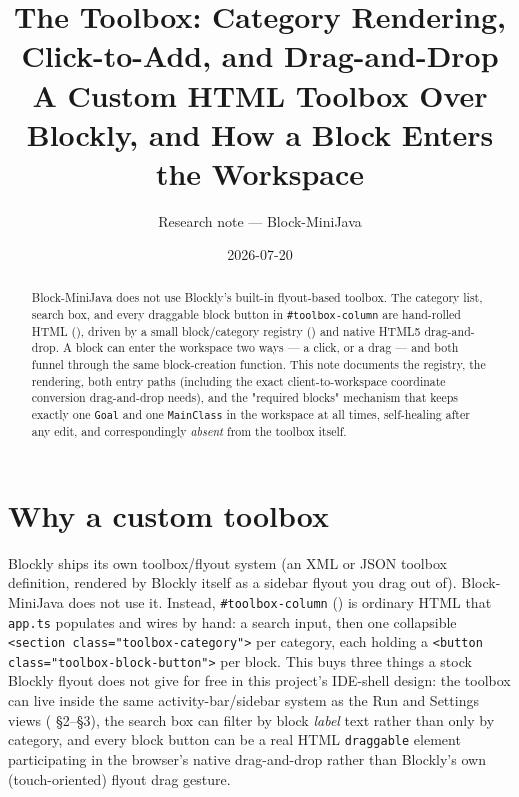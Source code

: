 \documentclass[11pt]{article}
\title{The Toolbox: Category Rendering, Click-to-Add, and Drag-and-Drop\\
\large A Custom HTML Toolbox Over Blockly, and How a Block Enters the Workspace}
\author{Research note --- Block-MiniJava}
\date{2026-07-20}
\begin{document}
\maketitle

\begin{abstract}
Block-MiniJava does not use Blockly's built-in flyout-based toolbox. The
category list, search box, and every draggable block button in
\texttt{\#toolbox-column} are hand-rolled HTML
(\texttt{}), driven by a small block/category registry
(\texttt{}) and native HTML5
drag-and-drop. A block can enter the workspace two ways --- a click, or a
drag --- and both funnel through the same block-creation function. This
note documents the registry, the rendering, both entry paths (including
the exact client-to-workspace coordinate conversion drag-and-drop needs),
and the "required blocks" mechanism that keeps exactly one \texttt{Goal}
and one \texttt{MainClass} in the workspace at all times, self-healing
after any edit, and correspondingly \emph{absent} from the toolbox itself.
\end{abstract}

\tableofcontents

\section{Why a custom toolbox}

Blockly ships its own toolbox/flyout system (an XML or JSON toolbox
definition, rendered by Blockly itself as a sidebar flyout you drag out
of). Block-MiniJava does not use it. Instead, \texttt{\#toolbox-column}
(\texttt{}) is ordinary HTML that \texttt{app.ts}
populates and wires by hand: a search input, then one collapsible
\texttt{<section class="toolbox-category">} per category, each holding a
\texttt{<button class="toolbox-block-button">} per block. This buys three
things a stock Blockly flyout does not give for free in this project's
IDE-shell design: the toolbox can live inside the same activity-bar/sidebar
system as the Run and Settings views (\texttt{}
\S2--\S3), the search box can filter by block \emph{label} text rather than
only by category, and every block button can be a real HTML
\texttt{draggable} element participating in the browser's native
drag-and-drop rather than Blockly's own (touch-oriented) flyout drag
gesture.
\end{document}
